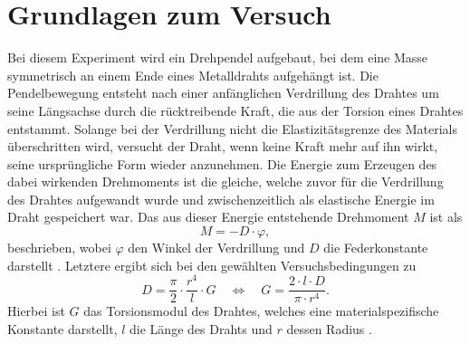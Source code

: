 \section{Grundlagen zum Versuch}
Bei diesem Experiment wird ein Drehpendel aufgebaut, bei dem eine Masse symmetrisch an einem Ende eines Metalldrahts aufgehängt ist. Die Pendelbewegung entsteht nach einer anfänglichen Verdrillung des Drahtes um seine Längsachse durch die rücktreibende Kraft, die aus der Torsion eines Drahtes entstammt. 
Solange bei der Verdrillung nicht die Elastizitätsgrenze des Materials überschritten wird, versucht der Draht, wenn keine Kraft mehr auf ihn wirkt, seine ursprüngliche Form wieder anzunehmen.
Die Energie zum Erzeugen des dabei wirkenden Drehmoments ist die gleiche, welche zuvor für die Verdrillung des Drahtes aufgewandt wurde und zwischenzeitlich als elastische Energie im Draht gespeichert war.
Das aus dieser Energie entstehende Drehmoment $M$ ist als
\begin{equation}
    \label{eq:drehmoment1}
    M = -D \cdot \varphi,
\end{equation}
beschrieben, wobei $\varphi$ den Winkel der Verdrillung und $D$ die Federkonstante darstellt \cite{Tipler2015}.
Letztere ergibt sich bei den gewählten Versuchsbedingungen zu
\begin{equation}
    \label{eq:torsionsmodul}
    D = \frac{\pi}{2} \cdot \frac{r^4}{l} \cdot G 
    \quad\Leftrightarrow\quad
    G = \frac{2 \cdot l \cdot D}{\pi \cdot r^4}.
\end{equation}
Hierbei ist $G$ das Torsionsmodul des Drahtes, welches eine materialspezifische Konstante darstellt, $l$ die Länge des Drahts und $r$ dessen Radius \cite{Westphal1971}.

